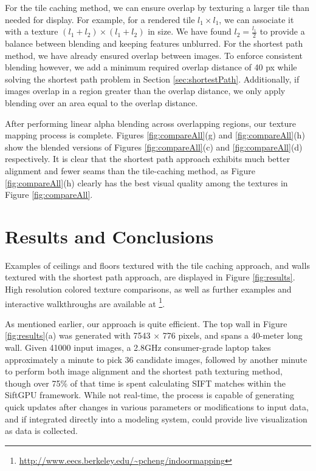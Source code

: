 \documentclass[]{spie}  %
\begin{document}
{For the tile caching method, we can ensure overlap by texturing a
larger tile than needed for display. For example, for a rendered tile
$l_1 \times l_1$, we can associate it with a texture $(l_1 + l_2)
\times (l_1 + l_2)$ in size.  We have found $l_2 = \frac{l_1}{2}$ to
provide a balance between blending and keeping features unblurred. For
the shortest path method, we have already ensured overlap between
images. To enforce consistent blending however, we add a minimum
required overlap distance of 40 px while solving the shortest path
problem in Section \ref{sec:shortestPath}. Additionally, if images
overlap in a region greater than the overlap distance, we only apply
blending over an area equal to the overlap distance.

After performing linear alpha blending across overlapping regions, our
texture mapping process is complete. Figures \ref{fig:compareAll}(g)
and \ref{fig:compareAll}(h) show the blended versions of Figures
\ref{fig:compareAll}(c) and \ref{fig:compareAll}(d) respectively. It
is clear that the shortest path approach exhibits much better
alignment and fewer seams than the tile-caching method, as Figure
\ref{fig:compareAll}(h) clearly has the best visual quality among the
textures in Figure \ref{fig:compareAll}.

\section{Results and Conclusions}
\label{sec:resultsAndConclusions}
Examples of ceilings and floors textured with the tile caching
approach, and walls textured with the shortest path approach, are
displayed in Figure \ref{fig:results}. High resolution colored texture
comparisons, as well as further examples and interactive walkthroughs
are available at
\footnote{\url{http://www.eecs.berkeley.edu/~pcheng/indoormapping}}.

As mentioned earlier, our approach is quite efficient. The top wall in
Figure \ref{fig:results}(a) was generated with 7543 $\times$ 776
pixels, and spans a 40-meter long wall. Given 41000 input images, a
2.8GHz consumer-grade laptop takes approximately a minute to pick 36
candidate images, followed by another minute to perform both image
alignment and the shortest path texturing method, though over 75\% of
that time is spent calculating SIFT matches within the SiftGPU
framework. While not real-time, the process is capable of generating
quick updates after changes in various parameters or modifications to
input data, and if integrated directly into a modeling system, could
provide live visualization as data is collected.

}
\end{document}
